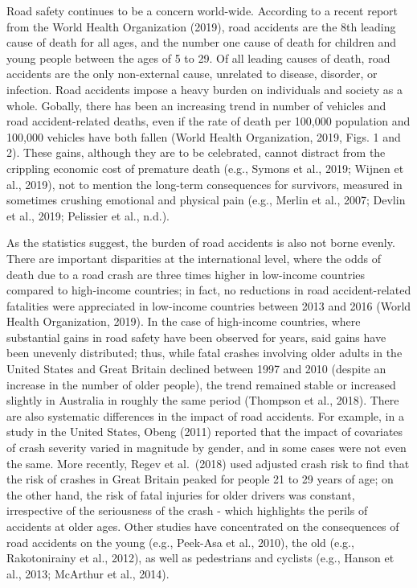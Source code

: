 \documentclass[]{elsarticle} %
\begin{document}
Road safety continues to be a concern world-wide. According to a recent
report from the World Health Organization (2019), road accidents are the
8th leading cause of death for all ages, and the number one cause of
death for children and young people between the ages of 5 to 29. Of all
leading causes of death, road accidents are the only non-external cause,
unrelated to disease, disorder, or infection. Road accidents impose a
heavy burden on individuals and society as a whole. Gobally, there has
been an increasing trend in number of vehicles and road accident-related
deaths, even if the rate of death per 100,000 population and 100,000
vehicles have both fallen (World Health Organization, 2019, Figs. 1 and
2). These gains, although they are to be celebrated, cannot distract
from the crippling economic cost of premature death (e.g., Symons et
al., 2019; Wijnen et al., 2019), not to mention the long-term
consequences for survivors, measured in sometimes crushing emotional and
physical pain (e.g., Merlin et al., 2007; Devlin et al., 2019; Pelissier
et al., n.d.).

As the statistics suggest, the burden of road accidents is also not
borne evenly. There are important disparities at the international
level, where the odds of death due to a road crash are three times
higher in low-income countries compared to high-income countries; in
fact, no reductions in road accident-related fatalities were appreciated
in low-income countries between 2013 and 2016 (World Health
Organization, 2019). In the case of high-income countries, where
substantial gains in road safety have been observed for years, said
gains have been unevenly distributed; thus, while fatal crashes
involving older adults in the United States and Great Britain declined
between 1997 and 2010 (despite an increase in the number of older
people), the trend remained stable or increased slightly in Australia in
roughly the same period (Thompson et al., 2018). There are also
systematic differences in the impact of road accidents. For example, in
a study in the United States, Obeng (2011) reported that the impact of
covariates of crash severity varied in magnitude by gender, and in some
cases were not even the same. More recently, Regev et al.~(2018) used
adjusted crash risk to find that the risk of crashes in Great Britain
peaked for people 21 to 29 years of age; on the other hand, the risk of
fatal injuries for older drivers was constant, irrespective of the
seriousness of the crash - which highlights the perils of accidents at
older ages. Other studies have concentrated on the consequences of road
accidents on the young (e.g., Peek-Asa et al., 2010), the old (e.g.,
Rakotonirainy et al., 2012), as well as pedestrians and cyclists (e.g.,
Hanson et al., 2013; McArthur et al., 2014).
\end{document}
